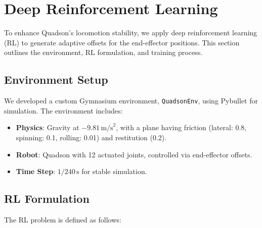 \documentclass[a4paper,11pt]{article}
\begin{document}
\section{Deep Reinforcement Learning}

To enhance Quadson's locomotion stability, we apply deep reinforcement learning (RL) to generate adaptive offsets for the end-effector positions. This section outlines the environment, RL formulation, and training process.

\subsection{Environment Setup}

We developed a custom Gymnasium environment, \texttt{QuadsonEnv}, using Pybullet for simulation. The environment includes:
\begin{itemize}
    \item \textbf{Physics}: Gravity at \(-9.81 \, \text{m/s}^2\), with a plane having friction (lateral: 0.8, spinning: 0.1, rolling: 0.01) and restitution (0.2).
    \item \textbf{Robot}: Quadson with 12 actuated joints, controlled via end-effector offsets.
    \item \textbf{Time Step}: \(1/240 \, \text{s}\) for stable simulation.
\end{itemize}

\subsection{RL Formulation}

The RL problem is defined as follows:
\end{document}
